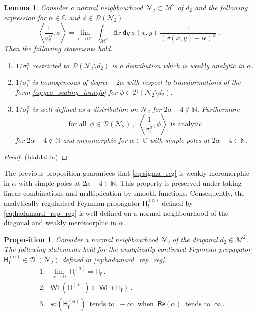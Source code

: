 \documentclass[12pt]{book}
\newcommand{\WF}{\mathsf{WF}}
\newcommand{\sd}{\mathsf{sd}}
\renewcommand{\Re}{\mathsf{Re}}
\newcommand{\sm}[1]{\left\langle#1\right\rangle}
\let\int\int
\newcommand{\Dcal}{\mathcal{D}}
\newcommand{\Mcal}{\mathcal{M}}
\newcommand{\Ncal}{\mathcal{N}}
\newcommand{\Cbb}{\mathbb{C}}
\newcommand{\Nbb}{\mathbb{N}}
\newcommand{\Hsf}{\mathsf{H}}
\newcommand{\dsf}{\mathsf{d}}
\newcommand{\fsf}{\mathsf{f}}
\theoremstyle{break}
\newtheorem{proposition}{Proposition}
\newtheorem{lemma}{Lemma}
\begin{document}
\begin{lemma}\label{prop:sigma_1}
Consider a normal neighbourhood $\Ncal_2 \subset\Mcal^2$ of $d_2$ and the following expression for $\alpha \in \Cbb$ and $\phi \in \Dcal(\Ncal_2)$
%
\begin{equation*}
\sm{ \frac{1}{\sigma^\alpha_\fsf} , \phi } = \lim_{\epsilon \to 0^+ } \ \int_{\Mcal^2} \dsf x \ \dsf y \ \phi(x,y) \ \frac{1}{(\sigma(x,y)+i\epsilon)^{\alpha}} \ .
\end{equation*}
%
Then the following statements hold.
%
\begin{enumerate}
%
\item $1/{\sigma^\alpha_\fsf}$ restricted to $\Dcal(\Ncal_2 \setminus d_2)$ is a distribution which is weakly analytic in $\alpha$.
%
\item $1/{\sigma^\alpha_\fsf}$ is homogeneous of degree $-2\alpha$ with respect to transformations of the form \eqref{eq:geo_scaling_transfo} for $\phi \in \Dcal(\Ncal_2\setminus d_2)$.
%
\item $1/{\sigma^\alpha_\fsf}$ is well defined as a distribution on $\Ncal_2$ for $2\alpha-4 \notin \Nbb$. Furthermore
%
\begin{equation*}
\mbox{for all } \ \phi \in \Dcal(\Ncal_2) \ , \ \ \sm{ \frac{1}{\sigma^\alpha_\fsf} , \phi } \ \mbox{ is analytic}
\end{equation*}
%
for $2\alpha-4\notin \Nbb$ and meromorphic for $\alpha \in \Cbb$ with simple poles at $2\alpha-4\in \mathbb{N}$. 
%
\end{enumerate}
%
\end{lemma}


\begin{proof}
(blablabla)
\end{proof}


The previous proposition guarantees that \eqref{eq:sigma_reg} is weakly meromorphic in $\alpha$ with simple poles at $2\alpha-4\in\Nbb$. This property is preserved under taking linear combinations and multiplication by smooth functions. Consequently, the analytically regularised Feynman propagator $\Hsf^{(\alpha)}_\fsf$ defined by \eqref{eq:hadamard_rep_reg} is well defined on a normal neighbourhood of the diagonal and weakly meromorphic in $\alpha$.


\begin{proposition}
Consider a normal neighbourhood $\Ncal_2$ of the diagonal $d_2\in\Mcal^2$. The following statements hold for the analytically continued Feynman propagator $\Hsf^{(\alpha)}_\fsf\in\Dcal^\prime(\Ncal_2)$ defined in \eqref{eq:hadamard_rep_reg}.
%
\begin{eqnarray*}
&\mbox{1.}& \underset{\alpha \to 0}{\lim} \ \Hsf^{(\alpha)}_\fsf = \Hsf_\fsf \ . \\
&\mbox{2.}& \WF\left(\Hsf^{(\alpha)}_\fsf\right) \subset \WF\left(\Hsf_\fsf\right) \ . \\
&\mbox{3.}& \sd\left(\Hsf^{(\alpha)}_\fsf\right) \ \mbox{ tends to } \ - \infty \ \mbox{ when } \ \Re\left(\alpha\right) \ \mbox{ tends to } \ \infty \ .  
\end{eqnarray*}
%
\end{proposition}
\end{document}
